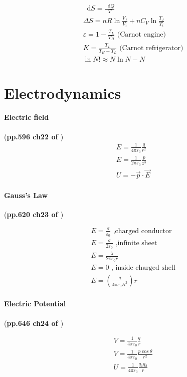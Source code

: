 \documentclass{article}
\newcommand*\diff{\mathop{}\!\mathrm{d}}
\numberwithin{equation}{subsection} %
\theoremstyle{definition}
\begin{document}
\begin{align}
    & \diff S = \frac{\diff Q}{T} \\
    & \Delta S = nR \ln{\frac{V_f}{V_i}} + nC_V \ln{\frac{T_f}{T_i}}
    \\
    & \varepsilon = 1-\frac{T_L}{T_H}  \text{ (Carnot engine)} \\
    & K = \frac{T_L}{T_H-T_L} \text{ (Carnot refrigerator)}  \\
    & \ln{N!} \approx N\ln{N} - N
\end{align}

\section{Electrodynamics}
\label{sec:Electrodynamics}

\paragraph{Electric field} (\textbf{pp.596 ch22 of \cite{book}})
\begin{align}
    & E = \frac{1}{4\pi \varepsilon_0} \frac{q}{r^2} \\
    & E = \frac{1}{2\pi \varepsilon_0} \frac{p}{z^3} \\
    & U = - \vec{p}\cdot \vec{E} 
\end{align}

\paragraph{Gauss's Law} (\textbf{pp.620 ch23 of \cite{book}})

\begin{align}
    & E = \frac{\sigma}{\varepsilon_0}\text{ ,charged conductor} \\
    & E = \frac{\sigma}{2\varepsilon_0}\text{ ,infinite sheet} \\
    & E = \frac{\lambda}{2\pi\varepsilon_0 r} \\
    & E = 0 \text{ , inside charged shell} \\
    & E = \left(\frac{q}{4\pi\varepsilon_0 R^3}\right) r
\end{align}

\paragraph{Electric Potential} (\textbf{pp.646 ch24 of \cite{book}})

\begin{align}
    & V = \frac{1}{4\pi\varepsilon_0}\frac{q}{r} \\
    & V = \frac{1}{4\pi\varepsilon_0}\frac{p\cos\theta}{r^2} \\
    & U = \frac{1}{4\pi\varepsilon_0}\frac{q_1 q_2}{r}
\end{align}
\end{document}
